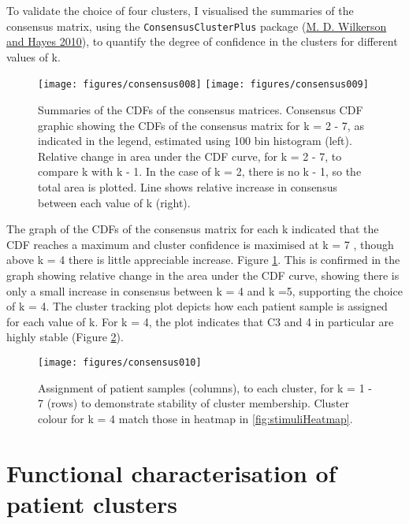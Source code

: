 \documentclass[11pt, a4paper, twosided]{book}
\begin{document}
To validate the choice of four clusters, I visualised the summaries of the consensus matrix, using the \texttt{ConsensusClusterPlus} package (\protect\hyperlink{ref-ConsensusClusterPlus}{M. D. Wilkerson and Hayes 2010}), to quantify the degree of confidence in the clusters for different values of k.


\begin{figure}

{\centering \texttt{[image: figures/consensus008]} \texttt{[image: figures/consensus009]} 

}

\caption{Summaries of the CDFs of the consensus matrices. Consensus CDF graphic showing the CDFs of the consensus matrix for k = 2 - 7, as indicated in the legend, estimated using 100 bin histogram (left). Relative change in area under the CDF curve, for k = 2 - 7, to compare k with k - 1. In the case of k = 2, there is no k - 1, so the total area is plotted. Line shows relative increase in consensus between each value of k (right).}\label{fig:consensusClusteringA}
\end{figure}
The graph of the CDFs of the consensus matrix for each k indicated that the CDF reaches a maximum and cluster confidence is maximised at k = 7 , though above k = 4 there is little appreciable increase. Figure \ref{fig:consensusClusteringA}. This is confirmed in the graph showing relative change in the area under the CDF curve, showing there is only a small increase in consensus between k = 4 and k =5, supporting the choice of k = 4. The cluster tracking plot depicts how each patient sample is assigned for each value of k. For k = 4, the plot indicates that C3 and 4 in particular are highly stable (Figure \ref{fig:consensusClusteringB}).


\begin{figure}

{\centering \texttt{[image: figures/consensus010]} 

}

\caption{Assignment of patient samples (columns), to each cluster, for k = 1 - 7 (rows) to demonstrate stability of cluster membership. Cluster colour for k = 4 match those in heatmap in \ref{fig:stimuliHeatmap}.}\label{fig:consensusClusteringB}
\end{figure}
\hypertarget{functional-characterisation-of-patient-clusters}{%
\section{Functional characterisation of patient clusters}\label{functional-characterisation-of-patient-clusters}}
\end{document}

